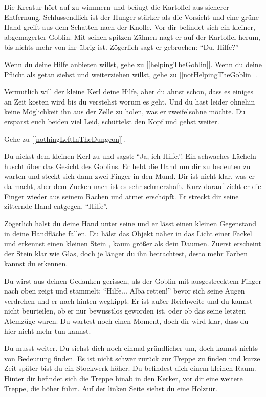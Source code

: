 Die Kreatur hört auf zu wimmern und beäugt die Kartoffel aus sicherer Entfernung. Schlussendlich ist der Hunger stärker als die Vorsicht und eine grüne Hand greift aus dem Schatten nach der Knolle. Vor dir befindet sich ein kleiner, abgemagerter Goblin. Mit seinen spitzen Zähnen nagt er auf der Kartoffel herum, bis nichts mehr von ihr übrig ist. Zögerlich sagt er gebrochen: ``Du, Hilfe?''

Wenn du deine Hilfe anbieten willst, gehe zu [\ref{helpingTheGoblin}].
Wenn du deine Pflicht als getan siehst und weiterziehen willst, gehe zu [\ref{notHelpingTheGoblin}].


Vermutlich will der kleine Kerl deine Hilfe, aber du ahnst schon, dass es einiges an Zeit kosten wird bis du verstehst worum es geht. Und du hast leider ohnehin keine Möglichkeit ihn aus der Zelle zu holen, was er zweifelsohne möchte. Du ersparst euch beiden viel Leid, schüttelst den Kopf und gehst weiter.

Gehe zu [\ref{nothingLeftInTheDungeon}].


Du nickst dem kleinen Kerl zu und sagst: ``Ja, ich Hilfe.''. Ein schwaches Lächeln huscht über das Gesicht des Goblins. Er hebt die Hand um dir zu bedeuten zu warten und steckt sich dann zwei Finger in den Mund. Dir ist nicht klar, was er da macht, aber dem Zucken nach ist es sehr schmerzhaft. Kurz darauf zieht er die Finger wieder aus seinem Rachen und atmet erschöpft. Er streckt dir seine zitternde Hand entgegen. ``Hilfe''.

Zögerlich hälst du deine Hand unter seine und er lässt einen kleinen Gegenstand in deine Handfläche fallen. Du hälst das Objekt näher in das Licht einer Fackel und erkennst einen kleinen Stein , kaum größer als dein Daumen. Zuerst erscheint der Stein klar wie Glas, doch je länger du ihn betrachtest, desto mehr Farben kannst du erkennen.

Du wirst aus deinen Gedanken gerissen, als der Goblin mit ausgestrecktem Finger nach oben zeigt und stammelt: ``Hilfe... Alba retten!'' bevor sich seine Augen verdrehen und er nach hinten wegkippt. Er ist außer Reichweite und du kannst nicht beurteilen, ob er nur bewusstlos geworden ist, oder ob das seine letzten Atemzüge waren. Du wartest noch einen Moment, doch dir wird klar, dass du hier nicht mehr tun kannst.

Du musst weiter. Du siehst dich noch einmal gründlicher um, doch kannst nichts von Bedeutung finden. Es ist nicht schwer zurück zur Treppe zu finden und kurze Zeit später bist du ein Stockwerk höher. Du befindest dich einem kleinen Raum. Hinter dir befindet sich die Treppe hinab in den Kerker, vor dir eine weitere Treppe, die höher führt. Auf der linken Seite siehst du eine Holztür.

